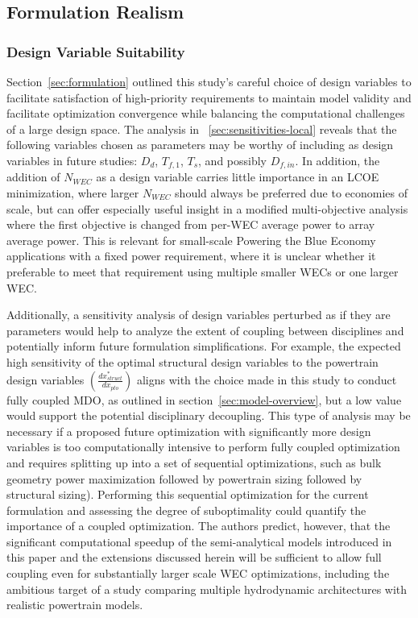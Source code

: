 \subsection{Formulation Realism}
\subsubsection{Design Variable Suitability}
Section~\ref{sec:formulation} outlined this study's careful choice of design variables to facilitate satisfaction of high-priority requirements to maintain model validity and facilitate optimization convergence while balancing the computational challenges of a large design space.
The analysis in \sectionautorefname~\ref{sec:sensitivities-local} reveals that the following variables chosen as parameters may be worthy of including as design variables in future studies: $D_d$, $T_{f,1}$, $T_s$, and possibly $D_{f,in}$.
In addition, the addition of $N_{WEC}$ as a design variable carries little importance in an LCOE minimization, where larger $N_{WEC}$ should always be preferred due to economies of scale, but can offer especially useful insight in a modified multi-objective analysis where the first objective is changed from per-WEC average power to array average power.
This is relevant for small-scale Powering the Blue Economy applications with a fixed power requirement, where it is unclear whether it preferable to meet that requirement using multiple smaller WECs or one larger WEC.

Additionally, a sensitivity analysis of design variables perturbed as if they are parameters would help to analyze the extent of coupling between disciplines and potentially inform future formulation simplifications.
For example, the expected high sensitivity of the optimal structural design variables to the powertrain design variables $\left(\frac{dx^*_{struct}}{dx_{pto}}\right)$ aligns with the choice made in this study to conduct fully coupled MDO, as outlined in section~\ref{sec:model-overview}, but a low value would support the potential disciplinary decoupling.
This type of analysis may be necessary if a proposed future optimization with significantly more design variables is too computationally intensive to perform fully coupled optimization and requires splitting up into a set of sequential optimizations, such as bulk geometry power maximization followed by powertrain sizing followed by structural sizing).
Performing this sequential optimization for the current formulation and assessing the degree of suboptimality could quantify the importance of a coupled optimization.
The authors predict, however, that the significant computational speedup of the semi-analytical models introduced in this paper and the extensions discussed herein will be sufficient to allow full coupling even for substantially larger scale WEC optimizations, including the ambitious target of a study comparing multiple hydrodynamic architectures with realistic powertrain models.

